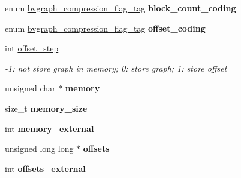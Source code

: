 \begin{DoxyCompactItemize}
\item 
\hypertarget{structbvgraph__tag_aa75598de72db9b96169e2cce6195ff55}{enum \hyperlink{bvgraph_8h_a4ea6daab9cc8f1f480167ac67a2bf2c5}{bvgraph\+\_\+compression\+\_\+flag\+\_\+tag} {\bfseries block\+\_\+count\+\_\+coding}}\label{structbvgraph__tag_aa75598de72db9b96169e2cce6195ff55}

\item 
\hypertarget{structbvgraph__tag_ab08754772ea70c977f9f083737084ee1}{enum \hyperlink{bvgraph_8h_a4ea6daab9cc8f1f480167ac67a2bf2c5}{bvgraph\+\_\+compression\+\_\+flag\+\_\+tag} {\bfseries offset\+\_\+coding}}\label{structbvgraph__tag_ab08754772ea70c977f9f083737084ee1}

\item 
\hypertarget{structbvgraph__tag_a89436d24dc639bc32f33f06ac4c29e95}{int \hyperlink{structbvgraph__tag_a89436d24dc639bc32f33f06ac4c29e95}{offset\+\_\+step}}\label{structbvgraph__tag_a89436d24dc639bc32f33f06ac4c29e95}

\begin{DoxyCompactList}\small\item\em -\/1\+: not store graph in memory; 0\+: store graph; 1\+: store offset \end{DoxyCompactList}\item 
\hypertarget{structbvgraph__tag_a4ae599be9e25eb2f385f8f62fd309510}{unsigned char $\ast$ {\bfseries memory}}\label{structbvgraph__tag_a4ae599be9e25eb2f385f8f62fd309510}

\item 
\hypertarget{structbvgraph__tag_a758977564069dc40d9e767009e45cabe}{size\+\_\+t {\bfseries memory\+\_\+size}}\label{structbvgraph__tag_a758977564069dc40d9e767009e45cabe}

\item 
\hypertarget{structbvgraph__tag_aee24fe9d68e793f589c933eefa031c91}{int {\bfseries memory\+\_\+external}}\label{structbvgraph__tag_aee24fe9d68e793f589c933eefa031c91}

\item 
\hypertarget{structbvgraph__tag_a864fd9941ccd05b43a51d8549602710b}{unsigned long long $\ast$ {\bfseries offsets}}\label{structbvgraph__tag_a864fd9941ccd05b43a51d8549602710b}

\item 
\hypertarget{structbvgraph__tag_a5ad57d1ee18d3b582b265b95d47d822d}{int {\bfseries offsets\+\_\+external}}\label{structbvgraph__tag_a5ad57d1ee18d3b582b265b95d47d822d}

\end{DoxyCompactItemize}


